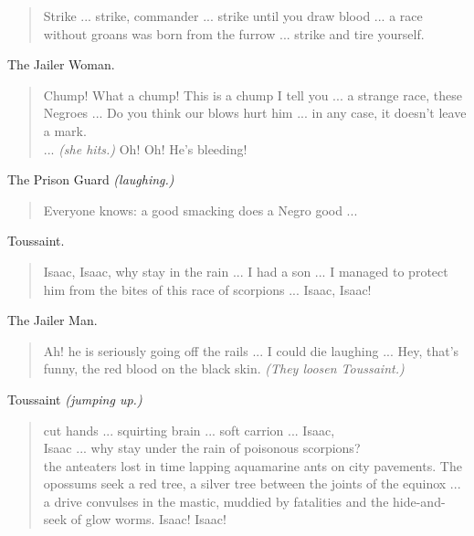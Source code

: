 \documentclass[letterpaper,article,12pt,oneside,notitlepage]{memoir}
\begin{document}
\begin{verse}
Strike ... strike, commander ... strike until you draw blood ... a race without groans was born from the furrow ... strike and tire yourself.  \\
\end{verse}

\begin{center}The Jailer Woman.\end{center}

\begin{verse}
Chump! What a chump! This is a chump I tell you ... a strange race, these Negroes ... Do you think our blows hurt him ... in any case, it doesn't leave a mark.  \\
... \textit{(she hits.)} Oh! Oh! He's bleeding! \\
\end{verse}

\begin{center}The Prison Guard  \textit{(laughing.)}\end{center}

\begin{verse}
Everyone knows: a good smacking does a Negro good ... \\
\end{verse}

\begin{center}Toussaint.\end{center}

\begin{verse}
Isaac, Isaac, why stay in the rain ... I had a son ... I managed to protect him from the bites of this race of scorpions ... Isaac, Isaac!  \\
\end{verse}

\begin{center}The Jailer Man.\end{center}

\begin{verse}
Ah! he is seriously going off the rails ... I could die laughing ... Hey, that's funny, the red blood on the black skin. \textit{(They loosen Toussaint.)}  \\
\end{verse}

\begin{center}Toussaint \textit{(jumping up.)}\end{center}

\begin{verse}
cut hands ... squirting brain ... soft carrion ... Isaac, \\
Isaac ... why stay under the rain of poisonous scorpions? \\
the anteaters lost in time lapping aquamarine ants on city pavements. The opossums seek a red tree, a silver tree between the joints of the equinox ... a drive convulses in the mastic, muddied by fatalities and the hide-and-seek of glow worms. Isaac! Isaac!   \\
\end{verse}
\end{document}
